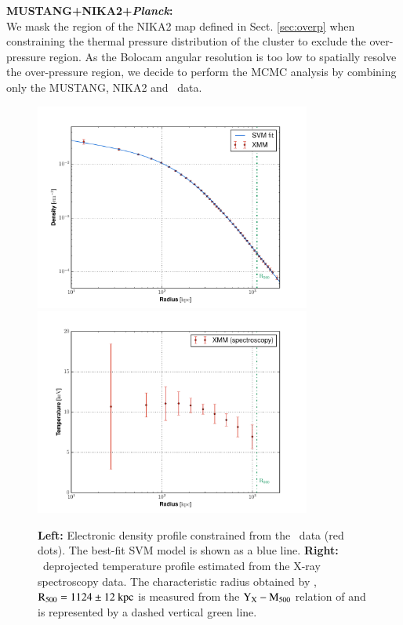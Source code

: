 \documentclass[traditabstract]{aa}
\begin{document}
\noindent\textbf{MUSTANG+NIKA2+\textit{Planck}:}\\
\noindent We mask the region of the NIKA2 map defined in Sect. \ref{sec:overp} when constraining the thermal pressure distribution of the cluster to exclude the over-pressure region. As the Bolocam angular resolution is too low to spatially resolve the over-pressure region, we decide to perform the MCMC analysis by combining only the MUSTANG, NIKA2 and \planck\ data. 
\begin{figure}[h!]
\centering
\includegraphics[height=6.8cm]{XMM_Density.pdf}
\includegraphics[height=6.8cm]{XMM_Temperature.pdf}
\caption{{\footnotesize \textbf{Left:} Electronic density profile constrained from the \xmm\ data (red dots). The best-fit SVM model \citep{vik06} is shown as a blue line. \textbf{Right:} \xmm\ deprojected temperature profile estimated from the X-ray spectroscopy data. The characteristic radius obtained by \xmm, $\rm{R_{500}} = 1124 \pm 12~\mathrm{kpc}$ is measured from the $\rm{Y_X} - \rm{M_{500}}$ relation of \cite{arn10} and is represented by a dashed vertical green line.}}
\label{fig:XMM_profiles}
\end{figure}
\end{document}
